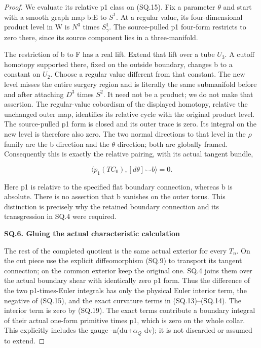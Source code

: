 \begin{proof}
We evaluate its relative p1 class on (SQ.15). Fix a parameter \(\theta\)
and start with a smooth graph map b:E to \(S^{1}\). At a regular value,
its four-dimensional product level in W is \(N^3\) times \(S^1_\gamma\).
The source-pulled p1 four-form restricts to zero there, since its
source component lies in a three-manifold.

The restriction of b to F has a real lift. Extend that lift over a
tube \(U_{3}\). A cutoff homotopy supported there, fixed on the outside
boundary, changes b to a constant on \(U_{2}\). Choose a regular value
different from that constant. The new level misses the entire
surgery region and is literally the same submanifold before and
after attaching \(D^{3}\) times \(S^{2}\). It need not be a product; we do not
make that assertion. The regular-value cobordism of the displayed
homotopy, relative the unchanged outer map, identifies its relative
cycle with the original product level. The source-pulled p1 form is
closed and its outer trace is zero. Its integral on the new level
is therefore also zero. The two normal directions to that level
in the \(\rho\) family are the b direction and the \(\theta\) direction;
both are globally framed. Consequently this is exactly the
relative pairing, with its actual tangent bundle,

\[
              \big\langle p_1(TC_0),[d\theta]\smile b
                         \big\rangle=0.                 \tag{SQ.19}
\]

Here p1 is relative to the specified flat boundary connection,
whereas b is absolute. There is no assertion that b vanishes on
the outer torus. This distinction is precisely why the retained
boundary connection and its transgression in SQ.4 were required.

\par

\medskip\noindent\textbf{SQ.6. Gluing the actual characteristic calculation}

\par\nobreak

The rest of the completed quotient is the same actual exterior for
every \(T_{n}\). On the cut piece use the explicit diffeomorphism (SQ.9)
to transport its tangent connection; on the common exterior keep
the original one. SQ.4 joins them over the actual boundary shear
with identically zero p1 form. Thus the difference of the two
p1-times-Euler integrals has only the physical Euler interior term, the negative of (SQ.15),
and the exact curvature terms in (SQ.13)--(SQ.14). The interior term
is zero by (SQ.19). The exact terms contribute a boundary integral
of their actual one-form primitive times p1, which is zero on the
whole collar. This explicitly includes the gauge
-n(du+\(\alpha_{Q}\) dv); it is not discarded or assumed to extend.


\end{proof}
